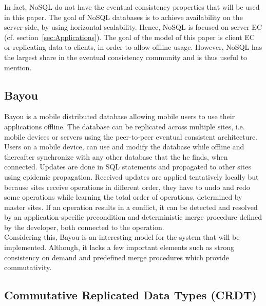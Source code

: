 \documentclass[a4paper,12pt]{report}
\begin{document}
In fact, NoSQL do not have the eventual consistency properties that will be used in this paper. The goal of NoSQL databases is to achieve availability on the server-side, by using horizontal scalability. Hence, NoSQL is focused on server EC (cf. section~\ref{sec:Applications}). The goal of the model of this paper is client EC or replicating data to clients, in order to allow offline usage. However, NoSQL has the largest share in the eventual consistency community and is thus useful to mention. 

\subsection{Bayou}\label{subsec:Bayou}

Bayou is a mobile distributed database allowing mobile users to use their applications offline. The database can be replicated across multiple sites, i.e. mobile devices or servers using the peer-to-peer eventual consistent architecture. Users on a mobile device, can use and modify the database while offline and thereafter synchronize with any other database that the he finds, when connected. Updates are done in SQL statements and propagated to other sites using epidemic propagation. Received updates are applied tentatively locally but because sites receive operations in different order, they have to undo and redo some operations while learning the total order of operations, determined by master sites. If an operation results in a conflict, it can be detected and resolved by an application-specific precondition and deterministic merge procedure defined by the developer, both connected to the operation. \\
Considering this, Bayou is an interesting model for the system that will be implemented. Although, it lacks a few important elements such as strong consistency on demand and predefined merge procedures which provide commutativity.

\subsection{Commutative Replicated Data Types (CRDT)}\label{subsec:CRDT}
\end{document}
